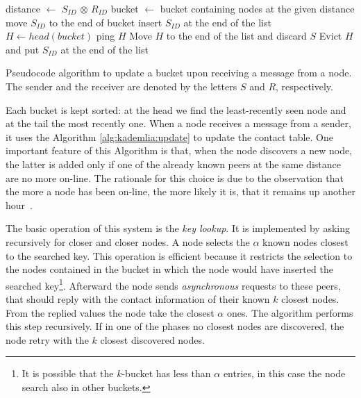 \begin{algorithm}[t]
	\begin{algorithmic}
		\State distance $\gets$ $S_{ID}$ $\otimes$ $R_{ID}$
		\State bucket $\gets$ bucket containing nodes at the given distance
		\State move $S_{ID}$ to the end of bucket
		\Else
		\State insert $S_{ID}$ at the end of the list
		\Else
		\State $H \gets head(bucket)$
		\State ping $H$
		\State Move $H$ to the end of the list and discard $S$
		\Else
		\State Evict $H$ and put $S_{ID}$ at the end of the list
		\EndIf
		\EndIf
		\EndIf
	\end{algorithmic}
	\caption{Pseudocode algorithm to update a bucket upon receiving a message from a node. The sender and the receiver are denoted by the letters $S$ and $R$, respectively.}
	\label{alg:kademlia:update}
\end{algorithm}

Each bucket is kept sorted: at the head we find the least-recently seen node
and at the tail the most recently one.
When a node receives a message from a sender, it uses
the Algorithm \autoref{alg:kademlia:update} to update the contact table.
One important feature of this Algorithm is that, when the node discovers
a new node, the latter is added only if one of the already known peers at the
same distance are no more on-line. The rationale for this choice is due
to the observation that the more a node has been on-line, the more likely it is,
that it remains up another hour~\cite{bib:kademlia}.

The basic operation of this system is the \emph{key lookup}.
It is implemented by asking recursively for closer and closer nodes.
A node selects the $\alpha$ known nodes
closest to the searched key. This operation is efficient because
it restricts the selection to the nodes contained in the bucket in which the
node would have inserted the searched key\footnote{It is possible that the 
	$k$-bucket
has less than $\alpha$ entries, in this case the node search also in other
buckets.}.
Afterward the node sends \emph{asynchronous} requests to these peers, that
should reply with the contact information of their known $k$ closest nodes.
From the replied values the node take the closest $\alpha$ ones.
The algorithm performs this step recursively.
If in one of the phases no closest nodes are discovered, the node retry with
the $k$ closest discovered nodes.

